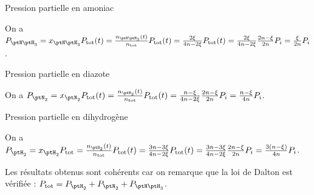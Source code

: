 

\begin{enonce}
Pression partielle en amoniac
\end{enonce}


\begin{corrige}
On a $P_{{{\ptN\ptH_3}}}=x_{{{\ptN\ptH_3}}} P_\mathrm{tot}(t)= \frac{n_{{\ptN\ptH_3}}(t)}{n_\mathrm{tot} } P_\mathrm{tot}(t)=\frac{2\xi}{4n-2\xi}P_\mathrm{tot}(t)=\frac{2\xi }{4n-2\xi} \frac{2n-\xi}{2n} P_i= \frac{\xi}{2n} P_i$.
\end{corrige}




\begin{enonce}
Pression partielle en diazote
\end{enonce}


\begin{corrige}
On a $P_{\ptN_2}=x_{\ptN_2} P_\mathrm{tot}(t)=\frac{n_{\ptN_2}(t)}{ n_\mathrm{tot} }P_\mathrm{tot}(t)=\frac{n-\xi }{4n-2\xi}\frac{2n-\xi}{2n} P_i = \frac{n-\xi}{4n} P_i$.
\end{corrige}



\begin{enonce}
Pression partielle en dihydrogène
\end{enonce}


\begin{corrigeNewpage}
On a $P_{{\ptH_2}}=x_{{\ptH_2}} P_\mathrm{tot}=\frac{n_{{\ptH_2}}(t)}{n_\mathrm{tot}}P_\mathrm{tot}(t)=\frac{3n-3\xi}{4n-2\xi} P_\mathrm{tot}(t) = \frac{3n-3\xi}{4n-2\xi} \frac{2n-\xi}{2n} P_i= \frac{3(n-\xi)}{4n} P_i$. 

Les résultats obtenus sont cohérents car on remarque que la loi de Dalton est vérifiée : $P_{\mathrm{tot}}=P_{{\ptH_2}}+P_{\ptN_2}+P_{{\ptN\ptH_3}}$.
\end{corrigeNewpage}

